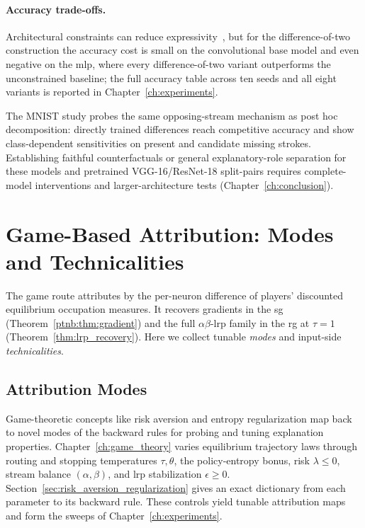 \paragraph{Accuracy trade-offs.}\label{subsec:dcinn_accuracy}

Architectural constraints can reduce expressivity~\parencite{Sill1997_MonotonicNetworks,Liu2020CertifiedMonotone}, but for the difference-of-two construction the accuracy cost is small on the convolutional base model and even negative on the \ac{mlp}, where every difference-of-two variant outperforms the unconstrained baseline; the full accuracy table across ten seeds and all eight variants is reported in Chapter~\ref{ch:experiments}.

\begin{remark}\label{rem:posthoc_bydesign}
The MNIST study probes the same opposing-stream mechanism as post hoc decomposition: directly trained differences reach competitive accuracy and show class-dependent sensitivities on present and candidate missing strokes. Establishing faithful counterfactuals or general explanatory-role separation for these models and pretrained VGG-16/ResNet-18 split-pairs requires complete-model interventions and larger-architecture tests (Chapter~\ref{ch:conclusion}).
\end{remark}

\section{Game-Based Attribution: Modes and Technicalities}\label{sec:game_based_attribution}

The game route attributes by the per-neuron difference of players' discounted equilibrium occupation measures. It recovers gradients in the \ac{sg} (Theorem~\ref{ptnb:thm:gradient}) and the full $\alpha\beta$-\ac{lrp} family in the \ac{rg} at $\tau=1$ (Theorem~\ref{thm:lrp_recovery}). Here we collect tunable \emph{modes} and input-side \emph{technicalities}.

\subsection{Attribution Modes}\label{subsec:attribution_modes}

Game-theoretic concepts like risk aversion and entropy regularization map back to novel modes of the backward rules for probing and tuning explanation properties. Chapter~\ref{ch:game_theory} varies equilibrium trajectory laws through routing and stopping temperatures $\tau,\theta$, the policy-entropy bonus, risk $\lambda\le0$, stream balance $(\alpha,\beta)$, and \ac{lrp} stabilization $\epsilon\ge0$. Section~\ref{sec:risk_aversion_regularization} gives an exact dictionary from each parameter to its backward rule. These controls yield tunable attribution maps and form the sweeps of Chapter~\ref{ch:experiments}.

